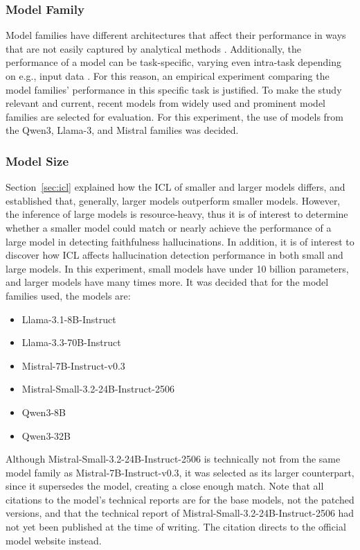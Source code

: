 \documentclass[english, 12pt, a4paper, sci, utf8, a-2b, online]{latex/definitions/aaltothesis}
\begin{document}
\subsubsection*{Model Family}

Model families have different architectures that affect their performance in ways that are not easily captured by analytical methods \cite{alqahtani2019performanceanalysiscomparisondistributed}. Additionally, the performance of a model can be task-specific, varying even intra-task depending on e.g., input data \cite{zhang2023whydidmodelfail}. For this reason, an empirical experiment comparing the model families' performance in this specific task is justified. To make the study relevant and current, recent models from widely used and prominent model families are selected for evaluation. For this experiment, the use of models from the Qwen3, Llama-3, and Mistral families was decided.

\subsubsection*{Model Size}

Section~\ref{sec:icl} explained how the ICL of smaller and larger models differs, and established that, generally, larger models outperform smaller models. However, the inference of large models is resource-heavy, thus it is of interest to determine whether a smaller model could match or nearly achieve the performance of a large model in detecting faithfulness hallucinations. In addition, it is of interest to discover how ICL affects hallucination detection performance in both small and large models. In this experiment, small models have under 10 billion parameters, and larger models have many times more. It was decided that for the model families used, the models are:
\begin{itemize}
    \item Llama-3.1-8B-Instruct \cite{grattafiori2024llama3herdmodels}
    \item Llama-3.3-70B-Instruct \cite{grattafiori2024llama3herdmodels}
    \item Mistral-7B-Instruct-v0.3 \cite{jiang2023mistral7b}
    \item Mistral-Small-3.2-24B-Instruct-2506 \cite{Mistral3webpage}
    \item Qwen3-8B \cite{yang2025qwen3technicalreport}
    \item Qwen3-32B \cite{yang2025qwen3technicalreport}
\end{itemize}
Although Mistral-Small-3.2-24B-Instruct-2506 is technically not from the same model family as Mistral-7B-Instruct-v0.3, it was selected as its larger counterpart, since it supersedes the model, creating a close enough match. Note that all citations to the model's technical reports are for the base models, not the patched versions, and that the technical report of Mistral-Small-3.2-24B-Instruct-2506 had not yet been published at the time of writing. The citation directs to the official model website instead.
\end{document}
